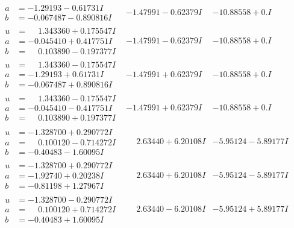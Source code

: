 \documentclass[1p]{elsarticle_modified}
\theoremstyle{definition}
\begin{document}
$$\begin{array}{c|c|c}
\begin{aligned}
a &= -1.29193 - 0.61731 I \\
b &= -0.067487 - 0.890816 I\end{aligned}
 & -1.47991 - 0.62379 I & -10.88558 + 0. I\phantom{ +0.000000I} \\ \hline\begin{aligned}
u &= \phantom{-}1.343360 + 0.175547 I \\
a &= -0.045410 + 0.417751 I \\
b &= \phantom{-}0.103890 - 0.197377 I\end{aligned}
 & -1.47991 - 0.62379 I & -10.88558 + 0. I\phantom{ +0.000000I} \\ \hline\begin{aligned}
u &= \phantom{-}1.343360 - 0.175547 I \\
a &= -1.29193 + 0.61731 I \\
b &= -0.067487 + 0.890816 I\end{aligned}
 & -1.47991 + 0.62379 I & -10.88558 + 0. I\phantom{ +0.000000I} \\ \hline\begin{aligned}
u &= \phantom{-}1.343360 - 0.175547 I \\
a &= -0.045410 - 0.417751 I \\
b &= \phantom{-}0.103890 + 0.197377 I\end{aligned}
 & -1.47991 + 0.62379 I & -10.88558 + 0. I\phantom{ +0.000000I} \\ \hline\begin{aligned}
u &= -1.328700 + 0.290772 I \\
a &= \phantom{-}0.100120 - 0.714272 I \\
b &= -0.40483 - 1.60095 I\end{aligned}
 & \phantom{-}2.63440 + 6.20108 I & -5.95124 - 5.89177 I \\ \hline\begin{aligned}
u &= -1.328700 + 0.290772 I \\
a &= -1.92740 + 0.20238 I \\
b &= -0.81198 + 1.27967 I\end{aligned}
 & \phantom{-}2.63440 + 6.20108 I & -5.95124 - 5.89177 I \\ \hline\begin{aligned}
u &= -1.328700 - 0.290772 I \\
a &= \phantom{-}0.100120 + 0.714272 I \\
b &= -0.40483 + 1.60095 I\end{aligned}
 & \phantom{-}2.63440 - 6.20108 I & -5.95124 + 5.89177 I \\ \hline\begin{aligned}

\end{aligned}
\end{array}$$
\end{document}
